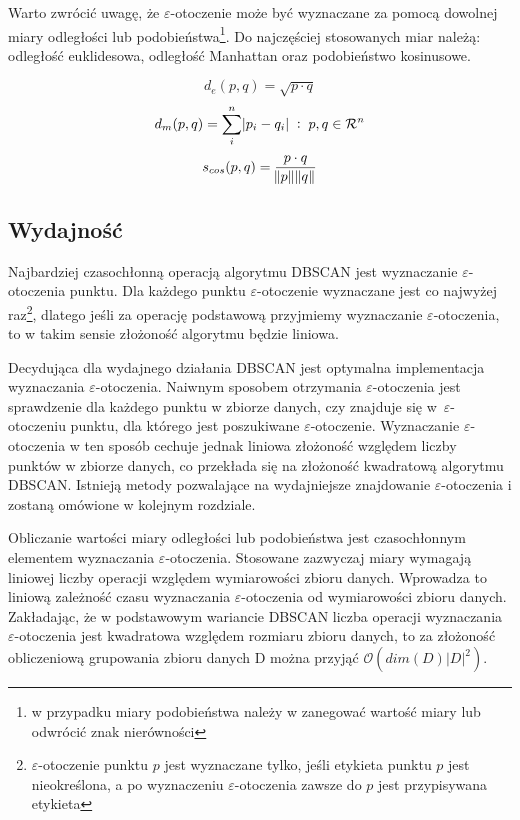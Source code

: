 Warto zwrócić uwagę, że $ \varepsilon $-otoczenie może być wyznaczane za pomocą dowolnej miary odległości lub podobieństwa\footnote{w przypadku miary podobieństwa należy w  zanegować wartość miary lub odwrócić znak nierówności}. Do najczęściej stosowanych miar należą: odległość euklidesowa, odległość Manhattan oraz podobieństwo kosinusowe.
\smallskip

\begin{equation}
	d_e(p, q) = \sqrt{p \cdot q}
\end{equation}
\begin{equation}
d_m(p, q) = \sum_i^{n}{\abs{p_i-q_i}} \;:\; p,q\in \mathcal{R}^n
\end{equation}
\begin{equation}
s_{cos}(p, q) = \frac{p \cdot q}{\norm{p}\norm{q}}
\end{equation}



\subsection{Wydajność}
Najbardziej czasochłonną operacją algorytmu DBSCAN jest wyznaczanie $ \varepsilon $-otoczenia punktu. Dla każdego punktu $ \varepsilon $-otoczenie wyznaczane jest co najwyżej raz\footnote{$ \varepsilon $-otoczenie punktu $ p $ jest wyznaczane tylko, jeśli etykieta punktu $ p $ jest nieokreślona, a  po wyznaczeniu $ \varepsilon $-otoczenia zawsze do $ p $ jest przypisywana etykieta}, dlatego jeśli za operację podstawową przyjmiemy wyznaczanie $ \varepsilon $-otoczenia, to w takim sensie złożoność algorytmu będzie liniowa.

Decydująca dla wydajnego działania DBSCAN jest optymalna implementacja wyznaczania $ \varepsilon $-otoczenia. Naiwnym sposobem otrzymania $ \varepsilon $-otoczenia jest sprawdzenie dla każdego punktu w zbiorze danych, czy znajduje się \mbox{w $ \varepsilon $-otoczeniu} punktu, dla którego jest poszukiwane $ \varepsilon $-otoczenie. Wyznaczanie $ \varepsilon $-otoczenia w ten sposób cechuje jednak liniowa złożoność względem liczby punktów w zbiorze danych, co przekłada się na złożoność kwadratową algorytmu DBSCAN. Istnieją metody pozwalające na wydajniejsze znajdowanie $ \varepsilon $-otoczenia i zostaną omówione w kolejnym rozdziale.

Obliczanie wartości miary odległości lub podobieństwa jest czasochłonnym elementem wyznaczania $ \varepsilon $-otoczenia. Stosowane zazwyczaj miary wymagają liniowej liczby operacji względem wymiarowości zbioru danych. Wprowadza to liniową zależność czasu wyznaczania $ \varepsilon $-otoczenia od wymiarowości zbioru danych. Zakładając, że w podstawowym wariancie DBSCAN liczba operacji wyznaczania $ \varepsilon $-otoczenia jest kwadratowa względem rozmiaru zbioru danych, to za złożoność obliczeniową grupowania zbioru danych D można przyjąć $ \mathcal{O}(dim(D)|D|^2) $.